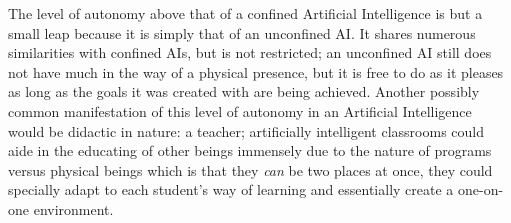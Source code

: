 The level of autonomy above that of a confined Artificial Intelligence is but a small leap because it is simply that of an unconfined AI. It shares numerous similarities with confined AIs, but is not restricted; an unconfined AI still does not have much in the way of a physical presence, but it is free to do as it pleases as long as the goals it was created with are being achieved. Another possibly common manifestation of this level of autonomy in an Artificial Intelligence would be didactic in nature: a teacher; artificially intelligent classrooms could aide in the educating of other beings immensely due to the nature of programs versus physical beings which is that they \textit{can} be two places at once, they could specially adapt to each student's way of learning and essentially create a one-on-one environment.